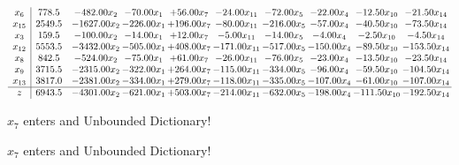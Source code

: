 \documentclass[9pt]{article}
\begin{document}
 \[\begin{array}{c| c c@{\hskip 2pt} c@{\hskip 2pt} c@{\hskip 2pt} c@{\hskip 2pt} c@{\hskip 2pt} c@{\hskip 2pt} c@{\hskip 2pt} c@{\hskip 2pt} }
 x_{6}   &  778.5 & -482.00 x_{2} & -70.00 x_{1} & + 56.00 x_{7} & -24.00 x_{11} & -72.00 x_{5} & -22.00 x_{4} & -12.50 x_{10} & -21.50 x_{14}\\
 x_{15}   &  2549.5 & -1627.00 x_{2} & -226.00 x_{1} & + 196.00 x_{7} & -80.00 x_{11} & -216.00 x_{5} & -57.00 x_{4} & -40.50 x_{10} & -73.50 x_{14}\\
 x_{3}   &  159.5 & -100.00 x_{2} & -14.00 x_{1} & + 12.00 x_{7} & -5.00 x_{11} & -14.00 x_{5} & -4.00 x_{4} & -2.50 x_{10} & -4.50 x_{14}\\
 x_{12}   &  5553.5 & -3432.00 x_{2} & -505.00 x_{1} & + 408.00 x_{7} & -171.00 x_{11} & -517.00 x_{5} & -150.00 x_{4} & -89.50 x_{10} & -153.50 x_{14}\\
 x_{8}   &  842.5 & -524.00 x_{2} & -75.00 x_{1} & + 61.00 x_{7} & -26.00 x_{11} & -76.00 x_{5} & -23.00 x_{4} & -13.50 x_{10} & -23.50 x_{14}\\
 x_{9}   &  3715.5 & -2315.00 x_{2} & -322.00 x_{1} & + 264.00 x_{7} & -115.00 x_{11} & -334.00 x_{5} & -96.00 x_{4} & -59.50 x_{10} & -104.50 x_{14}\\
 x_{13}   &  3817.0 & -2381.00 x_{2} & -334.00 x_{1} & + 279.00 x_{7} & -118.00 x_{11} & -335.00 x_{5} & -107.00 x_{4} & -61.00 x_{10} & -107.00 x_{14}\\
\hline
z    &  6943.5 & -4301.00 x_{2} & -621.00 x_{1} & + 503.00 x_{7} & -214.00 x_{11} & -632.00 x_{5} & -198.00 x_{4} & -111.50 x_{10} & -192.50 x_{14}\\
\end{array}\]


 $ x_{7} $ enters and Unbounded Dictionary!


 $ x_{7} $ enters and Unbounded Dictionary!
\end{document}
